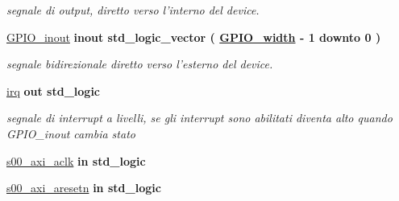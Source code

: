 \begin{DoxyCompactItemize}
\begin{DoxyCompactList}\small\item\em segnale di output, diretto verso l'interno del device. \end{DoxyCompactList}\item 
\hypertarget{group__my_g_p_i_o_ga8829699d739ef35a4c5da396ffd38387}{\hyperlink{group__my_g_p_i_o_ga8829699d739ef35a4c5da396ffd38387}{G\+P\+I\+O\+\_\+inout}  {\bfseries {\bfseries \textcolor{vhdlchar}{inout}\textcolor{vhdlchar}{ }}} {\bfseries \textcolor{vhdlchar}{std\+\_\+logic\+\_\+vector}\textcolor{vhdlchar}{ }\textcolor{vhdlchar}{(}\textcolor{vhdlchar}{ }\textcolor{vhdlchar}{ }\textcolor{vhdlchar}{ }\textcolor{vhdlchar}{ }{\bfseries \hyperlink{group__my_g_p_i_o_ga0b52ca75e9a6093b2b60d5e851803069}{G\+P\+I\+O\+\_\+width}} \textcolor{vhdlchar}{-\/}\textcolor{vhdlchar}{ } \textcolor{vhdldigit}{1} \textcolor{vhdlchar}{ }\textcolor{vhdlchar}{downto}\textcolor{vhdlchar}{ }\textcolor{vhdlchar}{ } \textcolor{vhdldigit}{0} \textcolor{vhdlchar}{ }\textcolor{vhdlchar}{)}\textcolor{vhdlchar}{ }} }\label{group__my_g_p_i_o_ga8829699d739ef35a4c5da396ffd38387}

\begin{DoxyCompactList}\small\item\em segnale bidirezionale diretto verso l'esterno del device. \end{DoxyCompactList}\item 
\hypertarget{group__my_g_p_i_o_ga4030f561f17a188ad2b51e1533b79082}{\hyperlink{group__my_g_p_i_o_ga4030f561f17a188ad2b51e1533b79082}{irq}  {\bfseries {\bfseries \textcolor{vhdlchar}{out}\textcolor{vhdlchar}{ }}} {\bfseries \textcolor{vhdlchar}{std\+\_\+logic}\textcolor{vhdlchar}{ }} }\label{group__my_g_p_i_o_ga4030f561f17a188ad2b51e1533b79082}

\begin{DoxyCompactList}\small\item\em segnale di interrupt a livelli, se gli interrupt sono abilitati diventa alto quando G\+P\+I\+O\+\_\+inout cambia stato \end{DoxyCompactList}\item 
\hypertarget{group__my_g_p_i_o_ga037f9e3df8559bfd59db37bcba9cb7a8}{\hyperlink{group__my_g_p_i_o_ga037f9e3df8559bfd59db37bcba9cb7a8}{s00\+\_\+axi\+\_\+aclk}  {\bfseries {\bfseries \textcolor{vhdlchar}{in}\textcolor{vhdlchar}{ }}} {\bfseries \textcolor{vhdlchar}{std\+\_\+logic}\textcolor{vhdlchar}{ }} }\label{group__my_g_p_i_o_ga037f9e3df8559bfd59db37bcba9cb7a8}

\item 
\hypertarget{group__my_g_p_i_o_ga8249c106fbd80196dcad2666c9f0b3fc}{\hyperlink{group__my_g_p_i_o_ga8249c106fbd80196dcad2666c9f0b3fc}{s00\+\_\+axi\+\_\+aresetn}  {\bfseries {\bfseries \textcolor{vhdlchar}{in}\textcolor{vhdlchar}{ }}} {\bfseries \textcolor{vhdlchar}{std\+\_\+logic}\textcolor{vhdlchar}{ }} }\label{group__my_g_p_i_o_ga8249c106fbd80196dcad2666c9f0b3fc}


\end{DoxyCompactItemize}

